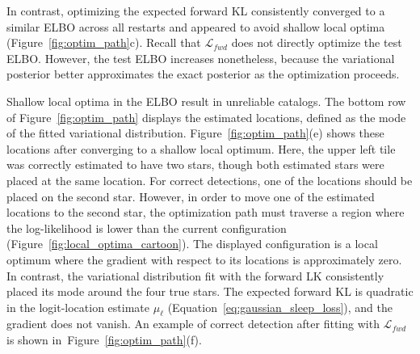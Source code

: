 In contrast, optimizing the expected forward KL consistently converged to
a similar ELBO across all restarts and appeared to avoid shallow local optima (Figure~\ref{fig:optim_path}c).
Recall that $\mathcal{L}_{fwd}$ does not directly optimize the test ELBO.
However, the test ELBO increases nonetheless, because the variational posterior
better approximates the exact posterior as the optimization proceeds.

Shallow local optima in the ELBO result in unreliable catalogs.
The bottom row of Figure~\ref{fig:optim_path} displays the estimated locations, defined as the mode of the fitted variational distribution.
Figure~\ref{fig:optim_path}(e) shows these locations after converging to a shallow local optimum.
Here, the upper left tile was correctly estimated to have two stars, though both estimated stars were placed at the same location.
For correct detections, one of the locations should be placed on the second star.
However, in order to move one of the estimated locations to the second star, the optimization path must traverse a region where the log-likelihood is lower than the current configuration (Figure~\ref{fig:local_optima_cartoon}).
The displayed configuration is a local optimum where the gradient with respect to its locations is approximately zero.
In contrast, the variational distribution fit with the forward LK
consistently placed its mode around the four true stars.
The expected forward KL is quadratic in the logit-location estimate
$\mu_\ell$ (Equation~\ref{eq:gaussian_sleep_loss}),
and the gradient does not vanish.
An example of correct detection after fitting with
$\mathcal{L}_{fwd}$ is shown in~Figure~\ref{fig:optim_path}(f).

